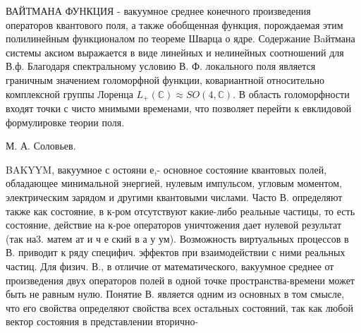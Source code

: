 \documentclass[10pt]{article}
\begin{document}
ВАЙТМАНА ФУНКЦИЯ - вакуумное среднее конечного произведения операторов квантового поля, а также обобщенная функция, порождаемая этим полилинейным функционалом по теореме Шварца о ядре. Содержание Baйтмана системы аксиом выражается в виде линейных и нелинейных соотношений для В.ф. Благодаря спектральному условию В. Ф. локального поля является граничным значением голоморфной функции, ковариантной относительно комплексной группы Лоренца $L_{+}(\mathbb{C}) \approx S O(4, \mathbb{C})$. В область голоморфности входят точки с чисто мнимыми временами, что позволяет перейти к евклидовой формулировке теории поля.



М. А. Соловьев.



BAKYYM, вакуумное с остояни е,- основное состояние квантовых полей, обладающее минимальной энергией, нулевым импульсом, угловым моментом, электрическим зарядом и другими квантовыми числами. Часто В. определяют также как состояние, в к-ром отсутствуют какие-либо реальные частицы, то есть состояние, действие на к-рое операторов уничтожения дает нулевой результат (так на3. матем ат и ч е ский в а у ум). Возможность виртуальных процессов в В. приводит к ряду специфич. эффектов при взаимодействии с ними реальных частиц. Для физич. В., в отличие от математического, вакуумное среднее от произведения двух операторов полей в одной точке пространства-времени может быть не равным нулю. Понятие В. является одним из основных в том смысле, что его свойства определяют свойства всех остальных состояний, так как любой вектор состояния в представлении вторично-
\end{document}

